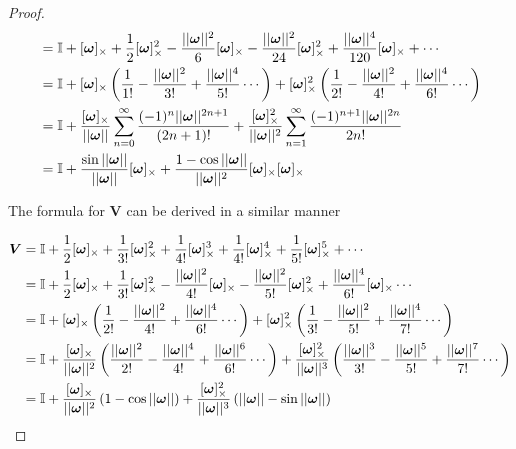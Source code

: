 \begin{proof}
\begin{subequations}
\begin{align*}
       &= \mathbb{I} + [\bm{\omega}]_{\times} + \frac{1}{2}[\bm{\omega}]_{\times}^2 -\frac{||\bm{\omega}||^2}{6}[\bm{\omega}]_{\times} - \frac{||\bm{\omega}||^2}{24}[\bm{\omega}]_{\times}^2 + \frac{||\bm{\omega}||^4}{120}[\bm{\omega}]_{\times} + \cdots \\
       &= \mathbb{I} + [\bm{\omega}]_{\times}\left(\frac{1}{1!} - \frac{||\bm{\omega}||^2}{3!} + \frac{||\bm{\omega}||^4}{5!} \cdots\right)
       + [\bm{\omega}]_{\times}^2\left(\frac{1}{2!} - \frac{||\bm{\omega}||^2}{4!} + \frac{||\bm{\omega}||^4}{6!} \cdots\right)\\
       &= \mathbb{I} + \frac{[\bm{\omega}]_{\times}}{||\bm{\omega}||}\sum_{n=0}^{\infty}\frac{(-1)^{n}||\bm{\omega}||^{2n+1}}{(2n+1)!}
       + \frac{[\bm{\omega}]_{\times}^2}{||\bm{\omega}||^2}\sum_{n=1}^{\infty}\frac{(-1)^{n+1}||\bm{\omega}||^{2n}}{2n!} \\
    &= \mathbb{I}
    + \frac{\sin{||\bm{\omega}||}}{||\bm{\omega}||}[\bm{\omega}]_{\times}
    + \frac{1-\cos{||\bm{\omega}||}}{||\bm{\omega}||^2}
       [\bm{\omega}]_{\times}[\bm{\omega}]_{\times}
\end{align*}
\end{subequations} 

The formula for \(\bm{V}\) can be derived in a similar manner

\begin{subequations}
\begin{align*}
\bm{V} &= \mathbb{I} + \frac{1}{2}[ \bm{\omega} ]_{\times}+ \frac{1}{3!}[ \bm{\omega} ]_{\times}^2 + \frac{1}{4!}[ \bm{\omega} ]_{\times}^3 + \frac{1}{4!}[ \bm{\omega} ]_{\times}^4 + \frac{1}{5!}[ \bm{\omega} ]_{\times}^5 + \cdots \\
    &= \mathbb{I} + \frac{1}{2}[ \bm{\omega} ]_{\times}+ \frac{1}{3!}[ \bm{\omega} ]_{\times}^2 - \frac{||\bm{\omega}||^2}{4!}[ \bm{\omega} ]_{\times} - \frac{||\bm{\omega}||^2}{5!}[ \bm{\omega} ]_{\times}^2 + \frac{||\bm{\omega}||^4}{6!}[ \bm{\omega} ]_{\times} \cdots \\
    &= \mathbb{I} + [ \bm{\omega} ]_{\times}\left(\frac{1}{2!} - \frac{||\bm{\omega}||^2}{4!} + \frac{||\bm{\omega}||^4}{6!} \cdots\right)
+ [ \bm{\omega} ]_{\times}^2\left(\frac{1}{3!} - \frac{||\bm{\omega}||^2}{5!} + \frac{||\bm{\omega}||^4}{7!}\cdots\right)\\
    &= \mathbb{I} + \frac{[ \bm{\omega} ]_{\times}}{||\bm{\omega}||^2}\left(\frac{||\bm{\omega}||^2}{2!} - \frac{||\bm{\omega}||^4}{4!} + \frac{||\bm{\omega}||^6}{6!} \cdots\right)
+ \frac{[ \bm{\omega} ]_{\times}^2}{||\bm{\omega}||^3}\left(\frac{||\bm{\omega}||^3}{3!} - \frac{||\bm{\omega}||^5}{5!} + \frac{||\bm{\omega}||^7}{7!}\cdots\right) \\
    &= \mathbb{I} + \frac{[ \bm{\omega} ]_{\times}}{||\bm{\omega}||^2}\left(1 - \cos{||\bm{\omega}||}\right)
    + \frac{[ \bm{\omega} ]_{\times}^2}{||\bm{\omega}||^3}\left(||\bm{\omega}||-\sin{||\bm{\omega}||}\right)
\end{align*}
\end{subequations}
\end{proof}


